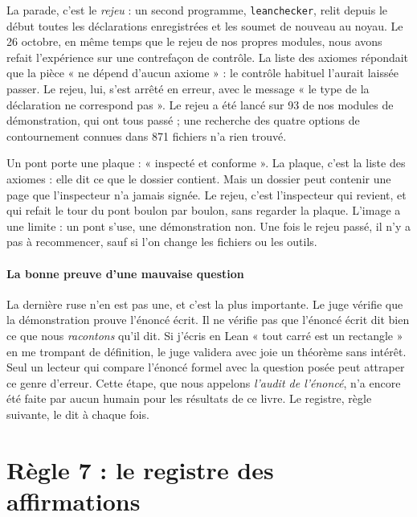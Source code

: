 La parade, c'est le \emph{rejeu} : un second programme, \texttt{leanchecker}, relit depuis le début toutes les
déclarations enregistrées et les soumet de nouveau au noyau. Le 26 octobre, en même temps que le rejeu de nos propres modules, nous
avons refait l'expérience sur une contrefaçon de contrôle. La liste des axiomes répondait que la pièce « ne dépend
d'aucun axiome » : le contrôle habituel l'aurait laissée passer. Le rejeu, lui, s'est arrêté en erreur, avec le
message « le type de la déclaration ne correspond pas ». Le rejeu a été lancé sur 93 de nos modules de démonstration, qui ont tous passé ; une
recherche des quatre options de contournement connues dans 871 fichiers n'a rien trouvé.

\begin{analogie}
Un pont porte une plaque : « inspecté et conforme ». La plaque, c'est la liste des axiomes : elle dit ce que le
dossier contient. Mais un dossier peut contenir une page que l'inspecteur n'a jamais signée. Le rejeu, c'est
l'inspecteur qui revient, et qui refait le tour du pont boulon par boulon, sans regarder la plaque. L'image a une
limite : un pont s'use, une démonstration non. Une fois le rejeu passé, il n'y a pas à recommencer, sauf si l'on change
les fichiers ou les outils.
\end{analogie}

\paragraph{La bonne preuve d'une mauvaise question} La dernière ruse n'en est pas une, et c'est la plus importante. Le
juge vérifie que la démonstration prouve l'énoncé écrit. Il ne vérifie pas que l'énoncé écrit dit bien ce que nous
\emph{racontons} qu'il dit. Si j'écris en Lean « tout carré est un rectangle » en me trompant de définition, le juge
validera avec joie un théorème sans intérêt. Seul un lecteur qui compare l'énoncé formel avec la question posée peut
attraper ce genre d'erreur. Cette étape, que nous appelons \emph{l'audit de l'énoncé}, n'a encore été faite par aucun
humain pour les résultats de ce livre. Le registre, règle suivante, le dit à chaque fois.

\section{Règle 7 : le registre des affirmations}

